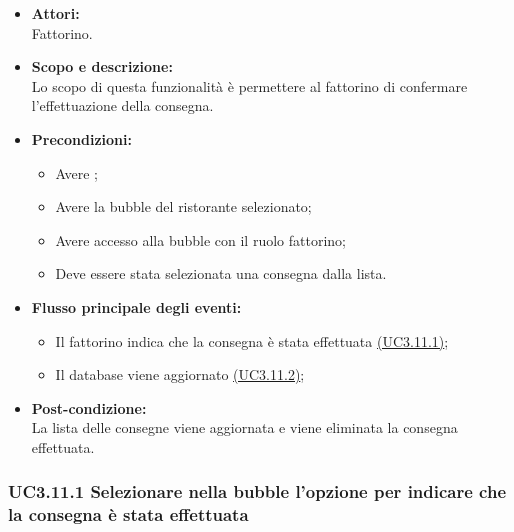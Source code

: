 \begin{itemize}
	\item \textbf{Attori:}
	\\Fattorino.
	\item \textbf{Scopo e descrizione:} 
	\\Lo scopo di questa funzionalità è permettere al fattorino di confermare l’effettuazione della consegna.
	\item \textbf{Precondizioni:}
	\begin{itemize}
		\item Avere ;
		\item Avere la bubble del ristorante selezionato;
		\item Avere accesso alla bubble con il ruolo fattorino;
		\item Deve essere stata selezionata una consegna dalla lista.
	\end{itemize}
	\item \textbf{Flusso principale degli eventi:}
	\begin{itemize}
		\item Il fattorino indica che la consegna è stata effettuata \hyperref[UC3.11.1]{(UC3.11.1)};
		\item Il database viene aggiornato \hyperref[UC3.11.2]{(UC3.11.2)};
	\end{itemize}
	\item \textbf{Post-condizione:}
	\\La lista delle consegne viene aggiornata e viene eliminata la consegna effettuata.
\end{itemize}

\subsubsection{UC3.11.1 Selezionare nella bubble l’opzione per indicare che la consegna è stata effettuata} \label{UC3.11.1}


